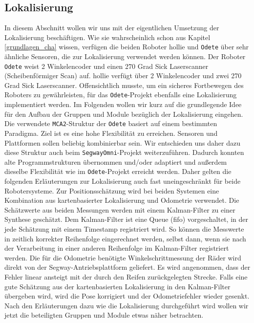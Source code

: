 \subsection{Lokalisierung} 
In diesem Abschnitt wollen wir uns mit der eigentlichen Umsetzung der
 Lokalisierung beschäftigen. Wie sie wahrscheinlich schon aus Kapitel
 \ref{grundlagen_cha} wissen, verfügen die beiden Roboter \gls{hollie} und
 \lstinline{Odete} über sehr ähnliche Sensoren, die zur Lokalisierung verwendet
 werden können. Der Roboter \lstinline{Odete} weist 2 Winkelencoder und einen 270 Grad Sick
 Laserscanner (Scheibenförmiger Scan) auf.
 \gls{hollie} verfügt über 2 Winkelencoder und zwei
 270 Grad Sick Laserscanner.
 Offensichtlich musste, um ein sicheres Fortbewegen des Roboters zu
 gewährleisten, für das \lstinline{Odete}-Projekt ebenfalls eine Lokalisierung implementiert werden.
 Im Folgenden wollen wir kurz auf die grundlegende Idee für den Aufbau der
 Gruppen und Module bezüglich der Lokalisierung eingehen.
 Die verwendete \lstinline{MCA2}-Struktur der \lstinline{Odete} basiert auf
 einem bestimmten Paradigma.
 Ziel ist es eine hohe Flexibilität zu erreichen. Sensoren und Plattformen sollen
 beliebig kombinierbar sein. Wir entschieden uns daher dazu diese Struktur auch
 beim \lstinline{SegwayOmni}-Projekt weiterzuführen. Dadurch konnten alte
 Programmstrukturen übernommen und/oder adaptiert und außerdem dieselbe
 Flexibilität wie im \lstinline{Odete}-Projekt erreicht werden. Daher gelten die folgenden Erläuterungen
 zur Lokalisierung auch fast uneingeschränkt für beide Robotersysteme.
 Zur Positionsschätzung wird bei beiden Systemen eine Kombination aus
 kartenbasierter Lokalisierung und Odometrie verwendet. Die Schätzwerte aus beiden Messungen werden mit einem Kalman-Filter zu einer
 Synthese geschätzt. Dem Kalman-Filter ist eine Queue (\gls{fifo}) vorgeschaltet, in der jede Schätzung
 mit einem Timestamp registriert wird. So können die Messwerte in zeitlich korrekter Reihenfolge
 eingerechnet werden, selbst dann, wenn sie nach der Verarbeitung in einer anderen Reihenfolge
 im Kalman-Filter registriert werden. Die für die Odometrie benötigte Winkelschrittmessung der Räder wird direkt
 von der Segway-Antriebsplattform geliefert.
 Es wird angenommen, dass der Fehler linear ansteigt mit der durch den Reifen zurückgelegten Strecke.
 Falls eine gute Schätzung aus der kartenbasierten Lokalisierung in den Kalman-Filter übergeben wird,
 wird die Pose korrigiert und der Odometriefehler wieder gesenkt.
 Nach den Erläuterungen dazu wie die Lokalisierung durchgeführt wird wollen wir
 jetzt die beteiligten Gruppen und Module etwas näher betrachten. 

